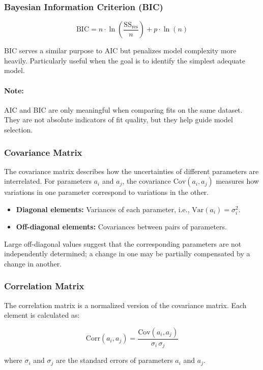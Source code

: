 \subsubsection*{Bayesian Information Criterion (BIC)}

\[
\mathrm{BIC} = n \cdot \ln\left(\frac{\mathrm{SS}_{\mathrm{res}}}{n}\right) + p \cdot \ln(n)
\]

BIC serves a similar purpose to AIC but penalizes model complexity more heavily. Particularly useful when the goal is to identify the simplest adequate model.
\paragraph{Note:} AIC and BIC are only meaningful when comparing fits on the same dataset. They are not absolute indicators of fit quality, but they help guide model selection.

\subsubsection*{Covariance Matrix}

The covariance matrix describes how the uncertainties of different parameters are interrelated. For parameters $a_i$ and $a_j$, the covariance $\mathrm{Cov}(a_i, a_j)$ measures how variations in one parameter correspond to variations in the other.

\begin{itemize}
    \item \textbf{Diagonal elements:} Variances of each parameter, i.e., $\mathrm{Var}(a_i) = \sigma_i^2$.
    \item \textbf{Off-diagonal elements:} Covariances between pairs of parameters.
\end{itemize}

Large off-diagonal values suggest that the corresponding parameters are not independently determined; a change in one may be partially compensated by a change in another.

\subsubsection*{Correlation Matrix}

The correlation matrix is a normalized version of the covariance matrix. Each element is calculated as:

\[
\mathrm{Corr}(a_i, a_j) = \frac{\mathrm{Cov}(a_i, a_j)}{\sigma_i \, \sigma_j}
\]

where $\sigma_i$ and $\sigma_j$ are the standard errors of parameters $a_i$ and $a_j$.

